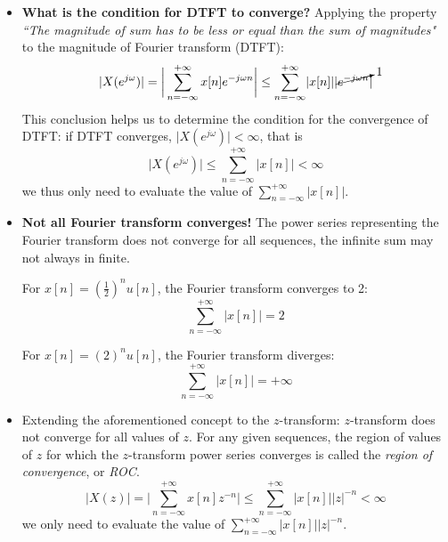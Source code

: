 \begin{itemize}
    \item \textbf{What is the condition for DTFT to converge?} Applying the property \textit{``The magnitude of sum has to be less or equal than the sum of magnitudes"} to the magnitude of Fourier transform (DTFT):
    \begin{align*}
        \lvert X(e^{j \omega}) \rvert
        & = \bigg\lvert \sum_{n=-\infty}^{+\infty} x[n] e^{-j\omega n} \bigg\rvert \leq  \sum_{n=-\infty}^{+\infty} \lvert x[n] \rvert \lvert \cancelto{1}{e^{-j\omega n}} \rvert \\
    \end{align*}
    This conclusion helps us to determine the condition for the convergence of DTFT: if DTFT converges, $\lvert X(e^{j \omega}) \rvert < \infty$, that is
    \[
        \lvert X(e^{j \omega}) \rvert \leq \sum_{n=-\infty}^{+\infty}\lvert x[n] \rvert < \infty
    \]
    we thus only need to evaluate the value of $\sum_{n=-\infty}^{+\infty}\lvert x[n] \rvert$.

    \item \textbf{Not all Fourier transform converges!} The power series representing the Fourier transform does not converge for all sequences, the infinite sum may not always in finite.
    
    \begin{minipage}{.45\textwidth}
    \begin{ex}{}
    For $x[n] = (\frac{1}{2})^n u[n]$, the Fourier transform converges to 2:
    \[
    \sum_{n=-\infty}^{+\infty} \lvert x[n] \rvert = 2
    \]
    \end{ex}
    \end{minipage} \hfill
    \begin{minipage}{.45\textwidth}
    \begin{ex}{}
    For $x[n] = (2)^n u[n]$, the Fourier transform diverges:
    \[
    \sum_{n=-\infty}^{+\infty} \lvert x[n] \rvert = +\infty
    \]
    \end{ex}
    \end{minipage}

    \item Extending the aforementioned concept to the $z$-transform: $z$-transform does not converge for all values of $z$. For any given sequences, the region of values of $z$ for which the $z$-transform power series converges is called the \textit{region of convergence}, or \textit{ROC}.
    \[
        \lvert X(z) \rvert = \bigg\lvert  \sum_{n=-\infty}^{+\infty} x[n] z^{-n} \bigg\rvert \leq \sum_{n=-\infty}^{+\infty} \lvert x[n] \rvert \lvert z \rvert^{-n} < \infty
    \]
    we only need to evaluate the value of $\sum_{n=-\infty}^{+\infty} \lvert x[n] \rvert \lvert z \rvert^{-n}$.


\end{itemize}
